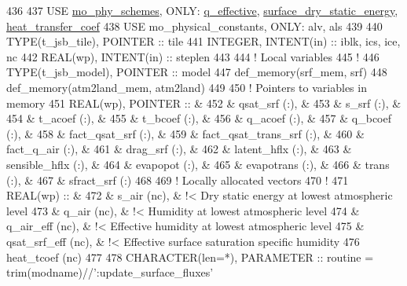 \begin{DoxyCode}
436 
437     \textcolor{keywordtype}{USE }\hyperlink{namespacemo__phy__schemes}{mo\_phy\_schemes}\textcolor{keywordtype}{,        ONLY}: \hyperlink{namespacemo__phy__schemes_a52234cb76d1efb2d2298d8fc66b61545}{q\_effective}, 
      \hyperlink{namespacemo__phy__schemes_afffc006f6b4ec423054e4e5f4943e19d}{surface\_dry\_static\_energy}, \hyperlink{namespacemo__phy__schemes_a9d1fe0b8e7cc0e86d2cf43ea5ebaac58}{heat\_transfer\_coef}
438     \textcolor{keywordtype}{USE }mo\_physical\_constants\textcolor{keywordtype}{, ONLY}: alv, als
439 
440     \textcolor{keywordtype}{TYPE}(t\_jsb\_tile),  \textcolor{keywordtype}{POINTER}    :: tile
441     \textcolor{keywordtype}{INTEGER},           \textcolor{keywordtype}{INTENT(in)} :: iblk, ics, ice, nc
442     \textcolor{keywordtype}{REAL(wp)},          \textcolor{keywordtype}{INTENT(in)} :: steplen
443 
444     \textcolor{comment}{! Local variables}
445     \textcolor{comment}{!}
446     \textcolor{keywordtype}{TYPE}(t\_jsb\_model), \textcolor{keywordtype}{POINTER}    :: model
447     def\_memory(srf\_mem, srf)
448     def\_memory(atm2land\_mem, atm2land)
449 
450     \textcolor{comment}{! Pointers to variables in memory}
451     \textcolor{keywordtype}{REAL(wp)}, \textcolor{keywordtype}{POINTER} ::       &
452       & qsat\_srf       (:),    &
453       & s\_srf          (:),    &
454       & t\_acoef        (:),    &
455       & t\_bcoef        (:),    &
456       & q\_acoef        (:),    &
457       & q\_bcoef        (:),    &
458       & fact\_qsat\_srf  (:),    &
459       & fact\_qsat\_trans\_srf  (:),    &
460       & fact\_q\_air     (:),    &
461       & drag\_srf       (:),    &
462       & latent\_hflx    (:),    &
463       & sensible\_hflx  (:),    &
464       & evapopot       (:),    &
465       & evapotrans     (:),    &
466       & trans          (:),    &
467       & sfract\_srf     (:)
468 
469     \textcolor{comment}{! Locally allocated vectors}
470     \textcolor{comment}{!}
471     \textcolor{keywordtype}{REAL(wp)} ::                &
472       & s\_air          (nc),   &  !< Dry static energy at lowest atmospheric level
473       & q\_air          (nc),   &  !< Humidity at lowest atmospheric level
474       & q\_air\_eff      (nc),   &  !< Effective humidity at lowest atmospheric level
475       & qsat\_srf\_eff   (nc),   &  !< Effective surface saturation specific humidity
476       heat\_tcoef       (nc)
477 
478     \textcolor{keywordtype}{CHARACTER(len=*)}, \textcolor{keywordtype}{PARAMETER} :: routine = trim(modname)//\textcolor{stringliteral}{':update\_surface\_fluxes'}

\end{DoxyCode}
